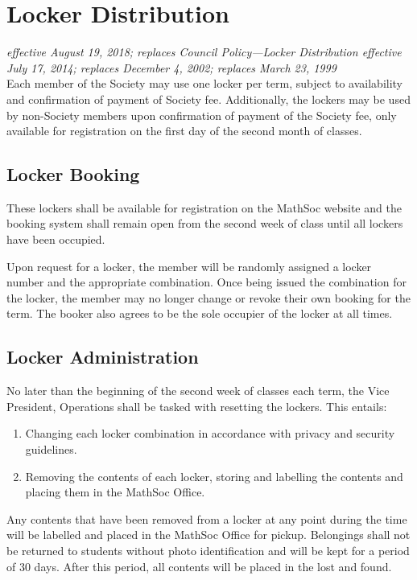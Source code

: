 \section{Locker Distribution}
\emph{effective August 19, 2018; replaces Council Policy---Locker Distribution
    effective July 17, 2014; replaces December 4, 2002; replaces March 23,
    1999}\\

Each member of the Society may use one locker per term, subject to
availability and confirmation of payment of Society fee. 
Additionally, the lockers may be used by non-Society members upon
confirmation of payment of the Society fee, 
only available for registration on the first day of the second month of
classes.

\subsection{Locker Booking}
These lockers shall be available for registration on the MathSoc website and
the booking system shall remain open from the second week of class until all
lockers have been occupied.

Upon request for a locker, the member will be randomly assigned a locker number
and the appropriate combination. Once being issued the combination for the
locker, the member may no longer change or revoke their own booking for the
term. The booker also agrees to be the sole occupier of the locker at all
times.

\subsection{Locker Administration}
No later than the beginning of the second week of classes each term, the Vice
President, Operations shall be tasked with resetting the lockers. This entails:

\begin{enumerate}
    \item Changing each locker combination in accordance with privacy and security
        guidelines.
    \item Removing the contents of each locker, storing and labelling the contents
        and placing them in the MathSoc Office.
\end{enumerate}

Any contents that have been removed from a locker at any point during the time
will be labelled and placed in the MathSoc Office for pickup. Belongings shall
not be returned to students without photo identification and will be kept for a
period of 30 days. After this period, all contents will be placed in the lost
and found.

